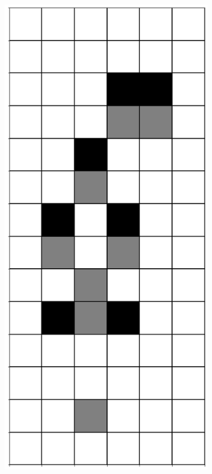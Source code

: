 \documentclass[12pt]{article}
\numberwithin{figure}{section} %
\begin{document}
\begin{figure}[H]
\begin{subfigure}{0.3\textwidth}
     		\subcaption{}
   	\end{subfigure}
     	\begin{subfigure}{0.3\textwidth}
     		\centering
     		\includegraphics[angle=270,width=\linewidth]{Section4/7.1}

\end{subfigure}
\end{figure}
\end{document}
